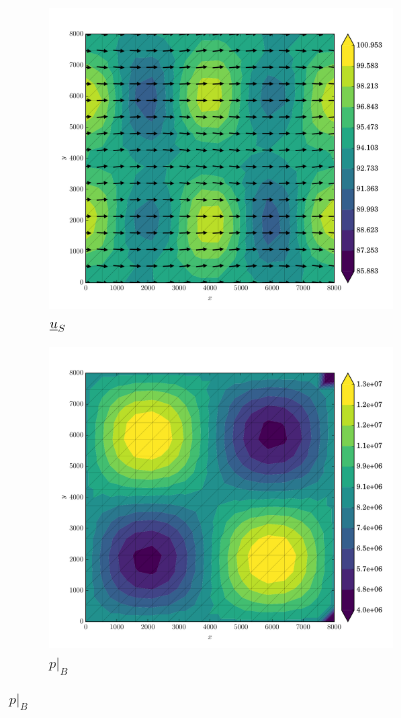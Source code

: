 \begin{figure}
  
  \centering 
  
  \begin{subfigure}[b]{0.3\linewidth}
    \includegraphics[width=\linewidth]{images/stress_balance/RS/U_mag.pdf}
  \caption{$\underline{u}_S$}
  \label{rs_msb_U}
  \end{subfigure}
  \begin{subfigure}[b]{0.3\linewidth}
    \includegraphics[width=\linewidth]{images/stress_balance/RS/p.pdf}
  \caption{$p |_B$}
  \label{rs_msb_p}
  \end{subfigure}


\end{figure}
